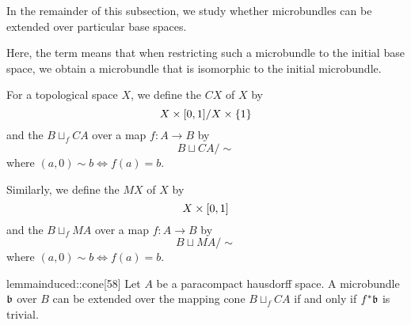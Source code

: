 \begin{myparagraph} In the remainder of this subsection, we study whether microbundles can be extended over particular base spaces.

Here, the term  means that when restricting such a microbundle to the initial base space, we obtain a microbundle that is isomorphic to the initial microbundle. \end{myparagraph}

\begin{myparagraph} For a topological space $X$, we define the  $CX$ of $X$ by \[ X \times{} [0, 1] / X \times \{1\} \] and the  $B \sqcup_f CA$ over a map $f: A \to B$ by \[ B \sqcup CA / \sim \] where $(a, 0) \sim b \iff f(a) = b$.

Similarly, we define the  $MX$ of $X$ by \[ X \times{} [0, 1] \] and the  $B \sqcup_f MA$ over a map $f: A \to B$ by \[ B \sqcup MA / \sim \] where $(a, 0) \sim b \iff f(a) = b$.

\end{myparagraph}

\begin{mystatement}{lemma}{induced::cone}[58] Let $A$ be a paracompact hausdorff space. A microbundle $\bb$ over $B$ can be extended over the mapping cone $B \sqcup_f CA$ if and only if $\ind{f}\bb$ is trivial. \end{mystatement}

